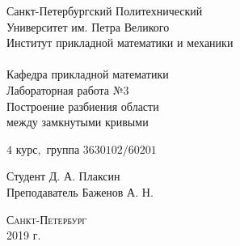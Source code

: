 \documentclass[a4]{article}
\begin{document}
\def\contentsname{\LARGE{Содержание}}
\thispagestyle{empty}
\begin{center} 
\vspace{2cm} 
{\Large \sc Санкт-Петербургский Политехнический}\\
\vspace{2mm}
{\Large \sc Университет} им. {\Large\sc Петра Великого}\\
\vspace{1cm}
{\large \sc Институт прикладной математики и механики\\ 
\vspace{0.5mm}
\textsc{}}\\ 
\vspace{0.5mm}
{\large\sc Кафедра прикладной математики}\\
\vspace{15mm}
{\huge \sc Лабораторная работа №$3$\\
\vspace{4mm}
Построение разбиения области\\
\vspace{4mm}
между замкнутыми кривыми
\vspace{6mm}
 }
\vspace*{2mm}
\vspace{1cm}

{\sc $4$ курс$,$ группа $3630102/60201$}

\vspace{2cm} 
Студент \hfill Д. А. Плаксин\\
\vspace{1cm}
Преподаватель \hfill Баженов А. Н.\\
\vspace{20mm} 

\end{center} 
\begin{center}
\vfill {\large\textsc{Санкт-Петербург}}\\ 
2019 г.
\end{center}

\end{document}

